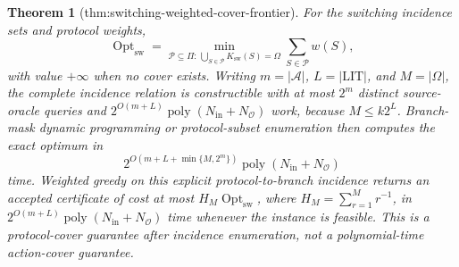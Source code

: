 \documentclass{article}
\newtheorem{theorem}{Theorem}
\begin{document}
\begin{theorem}[thm:switching-weighted-cover-frontier]\label{thm:switching-weighted-cover-frontier}
For the switching incidence sets and protocol weights,
\[
 \operatorname{Opt}_{\mathrm{sw}}
 =\min_{\mathcal P\subseteq\Pi:\,\bigcup_{S\in\mathcal P}K_{\mathrm{sw}}(S)=\Omega}
   \sum_{S\in\mathcal P}w(S),
\]
with value \(+\infty\) when no cover exists.  Writing \(m=|\mathcal A|\), \(L=|\mathrm{LIT}|\), and \(M=|\Omega|\), the complete incidence relation is constructible with at most \(2^m\) distinct source-oracle queries and \(2^{O(m+L)}\operatorname{poly}(N_{\mathrm{in}}+N_{\mathcal O})\) work, because \(M\leq k2^L\).  Branch-mask dynamic programming or protocol-subset enumeration then computes the exact optimum in
\[
 2^{O(m+L+\min\{M,2^m\})}\operatorname{poly}(N_{\mathrm{in}}+N_{\mathcal O})
\]
time.  Weighted greedy on this explicit protocol-to-branch incidence returns an accepted certificate of cost at most \(H_M\operatorname{Opt}_{\mathrm{sw}}\), where \(H_M=\sum_{r=1}^{M}r^{-1}\), in \(2^{O(m+L)}\operatorname{poly}(N_{\mathrm{in}}+N_{\mathcal O})\) time whenever the instance is feasible.  This is a protocol-cover guarantee after incidence enumeration, not a polynomial-time action-cover guarantee.
\end{theorem}
\end{document}

